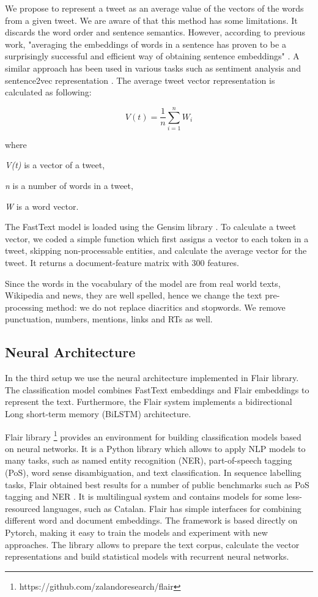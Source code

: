 \documentclass[10pt, a4paper]{article}
\begin{document}
We propose to represent a tweet as an average value of the vectors of the words from a given tweet. We are aware of that this method has some limitations. It discards the word order and sentence semantics. However, according to previous work, "averaging the embeddings of words in a sentence has proven to be a surprisingly successful and efficient way of obtaining sentence embeddings" \cite{DBLP:journals/corr/KenterBR16}. A similar approach has been used in various tasks such as sentiment analysis \cite{Anselmo17,socher-etal-2013-recursive} and sentence2vec representation \cite{Ben-Lhachemi18,DBLP:journals/corr/PagliardiniGJ17}. The average tweet vector representation is calculated as following:

\[V(t)=\frac{1}{n}\sum_{i=1}^{n}W_{i}\]

where

\textit{V(t)} is a vector of a tweet,

\textit{n} is a number of words in a tweet,

\textit{W} is a word vector.

The FastText model is loaded using the Gensim library \cite{rehurek_lrec}. To calculate a tweet vector, we coded a simple function which first assigns a vector to each token in a tweet, skipping non-processable entities, and calculate the average vector for the tweet. It returns a document-feature matrix with 300 features.

Since the words in the vocabulary of the model are from real world texts, Wikipedia and news, they are well spelled, hence we change the text pre-processing method: we do not replace diacritics and stopwords. We remove punctuation, numbers, mentions, links and RTs as well.

\subsection{Neural Architecture}\label{sec:neural-architecture}

In the third setup we use the neural architecture implemented in Flair library. The classification model combines FastText embeddings and Flair embeddings to represent the text. Furthermore, the Flair system implements a bidirectional Long short-term memory (BiLSTM) architecture.

Flair library \footnote{https://github.com/zalandoresearch/flair} provides an environment for building classification models based on neural networks. It is a Python library which allows to apply NLP models to many tasks, such as named entity recognition (NER), part-of-speech tagging (PoS), word sense disambiguation, and text classification. In sequence labelling tasks, Flair obtained best results for a number of public benchmarks such as PoS tagging and NER \cite{akbik-etal-2018-contextual}. It is multilingual system and contains models for some less-resourced languages, such as Catalan. Flair has simple interfaces for combining different word and document embeddings. The framework is based directly on Pytorch, making it easy to train the models and experiment with new approaches. The library allows to prepare the text corpus, calculate the vector representations and build statistical models with recurrent neural networks.
\end{document}
